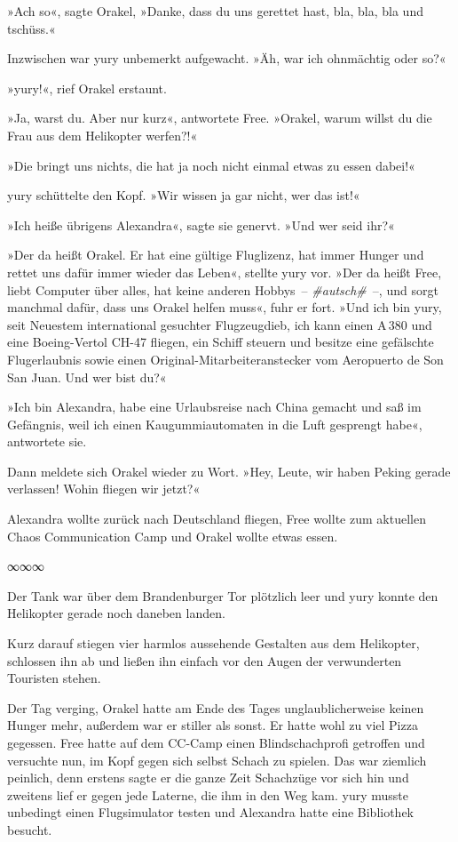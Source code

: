 »Ach so«, sagte Orakel, »Danke, dass du uns gerettet hast, bla, bla, bla und tschüss.«

Inzwischen war yury unbemerkt aufgewacht. »Äh, war ich ohnmächtig oder so?«

»yury!«, rief Orakel erstaunt.

»Ja, warst du. Aber nur kurz«, antwortete Free. »Orakel, warum willst du die Frau aus dem Helikopter werfen?!«

»Die bringt uns nichts, die hat ja noch nicht einmal etwas zu essen dabei!«

yury schüttelte den Kopf. »Wir wissen ja gar nicht, wer das ist!«

»Ich heiße übrigens Alexandra«, sagte sie genervt. »Und wer seid ihr?«

»Der da heißt Orakel. Er hat eine gültige Fluglizenz, hat immer Hunger und rettet uns dafür immer wieder das Leben«, stellte yury vor. »Der da heißt Free, liebt Computer über alles, hat keine anderen Hobbys~– \emph{\#autsch\#}~–, und sorgt manchmal dafür, dass uns Orakel helfen muss«, fuhr er fort. »Und ich bin yury, seit Neuestem international gesuchter Flugzeugdieb, ich kann einen A\,380 und eine Boeing-Vertol CH-47 fliegen, ein Schiff steuern und besitze eine gefälschte Flugerlaubnis sowie einen Original-Mitarbeiteranstecker vom Aeropuerto de Son San Juan. Und wer bist du?«

»Ich bin Alexandra, habe eine Urlaubsreise nach China gemacht und saß im Gefängnis, weil ich einen Kaugummiautomaten in die Luft gesprengt habe«, antwortete sie.

Dann meldete sich Orakel wieder zu Wort. »Hey, Leute, wir haben Peking gerade verlassen! Wohin fliegen wir jetzt?«

Alexandra wollte zurück nach Deutschland fliegen, Free wollte zum aktuellen Chaos Communication Camp und Orakel wollte etwas essen.

\begin{center}
    ∞∞∞
\end{center}

Der Tank war über dem Brandenburger Tor plötzlich leer und yury konnte den Helikopter gerade noch daneben landen.

Kurz darauf stiegen vier harmlos aussehende Gestalten aus dem Helikopter, schlossen ihn ab und ließen ihn einfach vor den Augen der verwunderten Touristen stehen.

Der Tag verging, Orakel hatte am Ende des Tages unglaublicherweise keinen Hunger mehr, außerdem war er stiller als sonst. Er hatte wohl zu viel Pizza gegessen. Free hatte auf dem CC-Camp einen Blindschachprofi getroffen und versuchte nun, im Kopf gegen sich selbst Schach zu spielen. Das war ziemlich peinlich, denn erstens sagte er die ganze Zeit Schachzüge vor sich hin und zweitens lief er gegen jede Laterne, die ihm in den Weg kam. yury musste unbedingt einen Flugsimulator testen und Alexandra hatte eine Bibliothek besucht.

